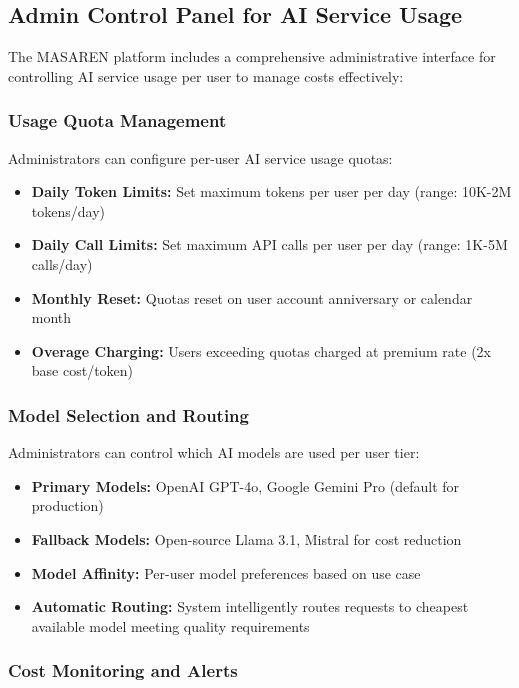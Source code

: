 \documentclass[11pt,a4paper]{article}
\begin{document}
\begin{enumerate}
\subsection{Admin Control Panel for AI Service Usage}

The MASAREN platform includes a comprehensive administrative interface for controlling AI service usage per user to manage costs effectively:

\subsubsection{Usage Quota Management}

Administrators can configure per-user AI service usage quotas:

\begin{itemize}
    \item \textbf{Daily Token Limits:} Set maximum tokens per user per day (range: 10K-2M tokens/day)
    \item \textbf{Daily Call Limits:} Set maximum API calls per user per day (range: 1K-5M calls/day)
    \item \textbf{Monthly Reset:} Quotas reset on user account anniversary or calendar month
    \item \textbf{Overage Charging:} Users exceeding quotas charged at premium rate (2x base cost/token)
\end{itemize}

\subsubsection{Model Selection and Routing}

Administrators can control which AI models are used per user tier:

\begin{itemize}
    \item \textbf{Primary Models:} OpenAI GPT-4o, Google Gemini Pro (default for production)
    \item \textbf{Fallback Models:} Open-source Llama 3.1, Mistral for cost reduction
    \item \textbf{Model Affinity:} Per-user model preferences based on use case
    \item \textbf{Automatic Routing:} System intelligently routes requests to cheapest available model meeting quality requirements
\end{itemize}

\subsubsection{Cost Monitoring and Alerts}


\end{enumerate}
\end{document}
